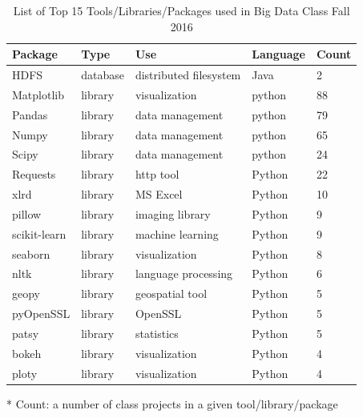 \documentclass[9pt,twocolumn,twoside]{styles/osajnl}
\begin{document}
\begin{table}[htb]
  \begin{center}
    \begin{small}
      \begin{threeparttable}
        \begin{tabular}{l|l|m{1.5cm}|m{1.5cm}|l}

    Package      & Type     & Use                    & Language & Count\tnote{*} \\ \hline \hline
    HDFS         & database & distributed filesystem & Java     & 2              \\ 
    Matplotlib   & library  & visualization          & python   & 88             \\ \hline
    Pandas       & library  & data management        & python   & 79             \\ \hline
    Numpy        & library  & data management        & python   & 65             \\ \hline
    Scipy        & library  & data management        & python   & 24             \\ \hline
    Requests     & library  & http tool              & Python   & 22             \\ \hline
    xlrd         & library  & MS Excel               & Python   & 10             \\ \hline
    pillow       & library  & imaging library        & Python   & 9              \\ \hline
    scikit-learn & library  & machine learning       & Python   & 9              \\ \hline
    seaborn      & library  & visualization          & Python   & 8              \\ \hline
    nltk         & library  & language processing    & Python   & 6              \\ \hline
    geopy        & library  & geospatial tool        & Python   & 5              \\ \hline
    pyOpenSSL    & library  & OpenSSL                & Python   & 5              \\ \hline
    patsy        & library  & statistics             & Python   & 5              \\ \hline
    bokeh        & library  & visualization          & Python   & 4              \\ \hline
    ploty        & library  & visualization          & Python   & 4              \\ \hline

        \end{tabular}
        \caption{List of Top 15 Tools/Libraries/Packages used in Big
          Data Class Fall 2016}
        \label{tab:tools-sp16}
        \begin{tablenotes}
        \item[*] Count: a number of class projects in a given tool/library/package
        \end{tablenotes}
      \end{threeparttable}
    \end{small}
  \end{center}
\end{table}
\end{document}

